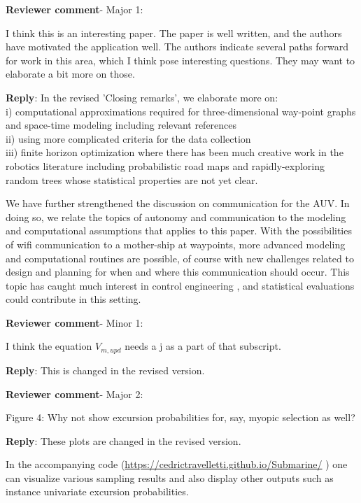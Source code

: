 \documentclass[a4paper]{article}
\def\revcom{\textbf{Reviewer comment}}
\def\reply{\textbf{Reply}}
\begin{document}
\begin{answers}

\item{\revcom - Major 1:}\label{r3c1}

I think this is an interesting paper. The paper is well written, 
and the authors have motivated the application well. 
The authors indicate several paths forward for work in this area, which I think pose interesting questions. They may want to elaborate a bit more on those.

\reply: In the revised 'Closing remarks', we elaborate more on: \\
i) computational approximations required for three-dimensional way-point graphs and space-time modeling including relevant references \citep{sigrist2015stochastic,richardson2017sparsity} \\ 
ii) using more complicated criteria for the data collection \\
iii)
finite horizon optimization where there has been much creative work in the robotics literature including probabilistic road maps and rapidly-exploring random trees \citep{karaman2011sampling} whose statistical properties are not yet clear.

We have further strengthened the discussion on communication for the AUV. In doing so, we relate the topics of autonomy and communication to the modeling and computational assumptions that applies to this paper. With the possibilities of wifi communication to a mother-ship at waypoints, more advanced modeling and computational routines are possible, of course with new challenges related to design and planning for when and where this communication should occur. This topic has caught much interest in control engineering \citep{zolich2019survey}, and statistical evaluations could contribute in this setting.

\item{\revcom - Minor 1:}\label{r3c2}

I think the equation $V_{m,upd}$ needs a j as a part of that subscript.

\reply: This is changed in the revised version.

\item{\revcom - Major 2:}\label{r3c3}

Figure 4: Why not show excursion probabilities for, say, myopic selection as well?

\reply: These plots are changed in the revised version. 

In the accompanying code (\url{https://cedrictravelletti.github.io/Submarine/} )
one can visualize various sampling results and also display other outputs such as instance univariate excursion probabilities.

\end{answers}


\footnotesize



\end{document}
